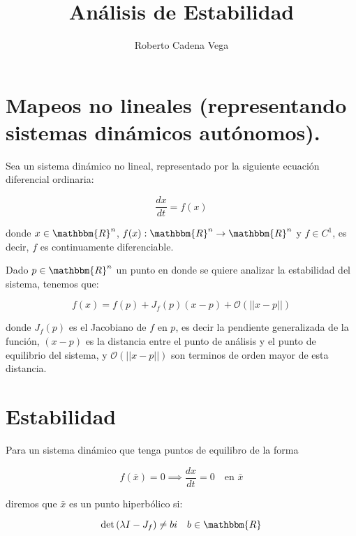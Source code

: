 

\title{Análisis de Estabilidad}
\author{Roberto Cadena Vega}


    \maketitle

    \section{Mapeos no lineales (representando sistemas dinámicos autónomos).}

        Sea un sistema dinámico no lineal, representado por la siguiente ecuación diferencial ordinaria:

        \begin{equation}
            \frac{dx}{dt} = f(x)
        \end{equation}

        donde $x \in \mathbbm{R}^n$, $f(x) : \mathbbm{R}^n \to \mathbbm{R}^n$ y $f \in C^1$, es decir, $f$ es continuamente diferenciable.

        Dado $p \in \mathbbm{R}^n$ un punto en donde se quiere analizar la estabilidad del sistema, tenemos que:

        \begin{equation}
            f(x) = f(p) + J_f(p)(x-p) + \mathcal{O}(||x-p||)
        \end{equation}

        donde $J_f(p)$ es el Jacobiano de $f$ en $p$, es decir la pendiente generalizada de la función, $(x-p)$ es la distancia entre el punto de análisis y el punto de equilibrio del sistema, y $\mathcal{O}(||x-p||)$ son terminos de orden mayor de esta distancia.

    \section{Estabilidad}

        Para un sistema dinámico que tenga puntos de equilibro de la forma

        \begin{equation}
            f(\bar{x}) = 0 \implies \frac{dx}{dt} = 0 \quad \text{en } \bar{x}
        \end{equation}

        diremos que $\bar{x}$ es un punto hiperbólico si:

        \begin{equation}
            \det{(\lambda I - J_f)} \ne bi \quad b \in \mathbbm{R}
        \end{equation}

